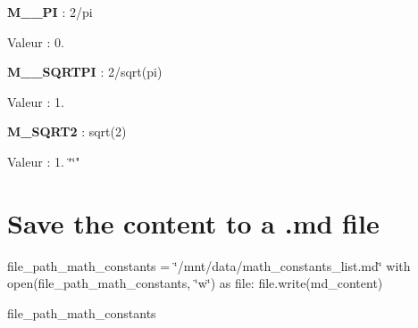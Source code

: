 \begin{DoxyItemize}
\item {\bfseries M\+\_\+\_\+\+PI} \+: 2/pi
\begin{DoxyItemize}
\item Valeur \+: 0.
\end{DoxyItemize}
\item {\bfseries M\+\_\+\_\+\+S\+Q\+R\+T\+PI} \+: 2/sqrt(pi)
\begin{DoxyItemize}
\item Valeur \+: 1.
\end{DoxyItemize}
\item {\bfseries M\+\_\+\+S\+Q\+R\+T2} \+: sqrt(2)
\begin{DoxyItemize}
\item Valeur \+: 1. \char`\"{}\char`\"{}"
\end{DoxyItemize}
\end{DoxyItemize}

\section*{Save the content to a .md file}

file\+\_\+path\+\_\+math\+\_\+constants = \char`\"{}/mnt/data/math\+\_\+constants\+\_\+list.\+md\char`\"{} with open(file\+\_\+path\+\_\+math\+\_\+constants, \char`\"{}w\char`\"{}) as file\+: file.\+write(md\+\_\+content)

file\+\_\+path\+\_\+math\+\_\+constants 